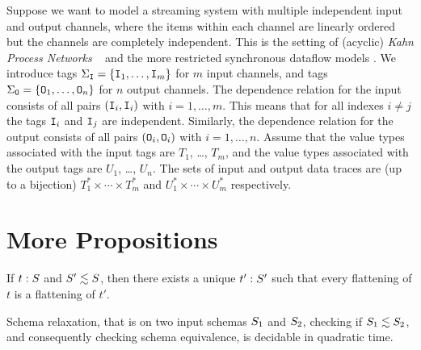 
\begin{example}
\label{45:ex:channels}
Suppose we want to model a streaming system with multiple independent input and output channels, where the items within each channel are linearly ordered but the channels are completely independent. This is the setting of (acyclic) \emph{Kahn Process Networks} ~\cite{gilles1974semantics} and the more restricted synchronous dataflow models \cite{lee1987synchronous, benveniste2003synchronous}. We introduce tags $\Sigma_\tg{I} = \{ \tg{I}_1, \ldots, \tg{I}_m \}$ for $m$ input channels, and tags $\Sigma_\tg{O} = \{ \tg{O}_1, \ldots, \tg{O}_n \}$ for $n$ output channels.
The dependence relation for the input consists of all pairs $(\tg{I}_i,\tg{I}_i)$ with $i = 1, \ldots, m$. This means that for all indexes $i \neq j$ the tags $\tg{I}_i$ and $\tg{I}_j$ are independent. Similarly, the dependence relation for the output consists of all pairs $(\tg{O}_i,\tg{O}_i)$ with $i = 1, \ldots, n$. Assume that the value types associated with the input tags are $T_1$, \ldots, $T_m$, and the value types associated with the output tags are $U_1$, \ldots, $U_n$. The sets of input and output data traces are (up to a bijection) $T^*_1 \times \cdots \times T^*_m$ and $U^*_1 \times \cdots \times U^*_m$ respectively.
\end{example}

\section{More Propositions}

\begin{proposition}
\label{45:prop:schema-relaxation-flattening}
If $t: \ss$ and $\ss' \lesssim \ss$,
then there exists a unique $t': \ss'$ such that
every flattening of $t$ is a flattening of $t'$.
\end{proposition}

\begin{proposition}
\label{45:prop:schema-relaxation-decidable}
Schema relaxation, that is on two input schemas $\ss_1$ and $\ss_2$, checking if $\ss_1 \lesssim \ss_2$, and consequently checking schema equivalence, is decidable in quadratic time.
\end{proposition}

